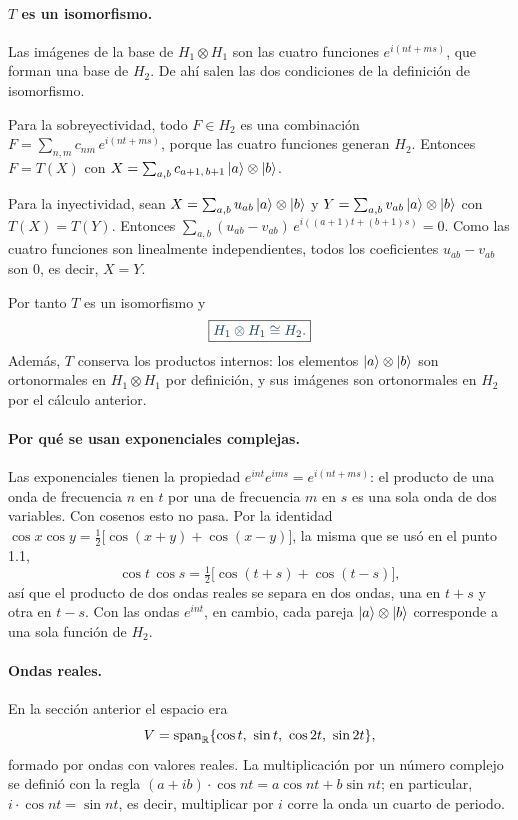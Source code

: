 \paragraph{$T$ es un isomorfismo.} Las imágenes de la base de $H_1\otimes H_1$ son las cuatro funciones $e^{i(nt+ms)}$, que forman una base de $H_2$. De ahí salen las dos condiciones de la definición de isomorfismo.

Para la sobreyectividad, todo $F\in H_2$ es una combinación $F=\sum_{n,m}c_{nm}\,e^{i(nt+ms)}$, porque las cuatro funciones generan $H_2$. Entonces $F=T(X)$ con $X=\sum_{a,b}c_{a+1,\,b+1}\,\lvert a\rangle\otimes\lvert b\rangle$.

Para la inyectividad, sean $X=\sum_{a,b}u_{ab}\,\lvert a\rangle\otimes\lvert b\rangle$ y $Y=\sum_{a,b}v_{ab}\,\lvert a\rangle\otimes\lvert b\rangle$ con $T(X)=T(Y)$. Entonces $\sum_{a,b}(u_{ab}-v_{ab})\,e^{i((a+1)t+(b+1)s)}=0$. Como las cuatro funciones son linealmente independientes, todos los coeficientes $u_{ab}-v_{ab}$ son $0$, es decir, $X=Y$.

Por tanto $T$ es un isomorfismo y
\[
  \destacado{H_1\otimes H_1\cong H_2 .}
\]
Además, $T$ conserva los productos internos: los elementos $\lvert a\rangle\otimes\lvert b\rangle$ son ortonormales en $H_1\otimes H_1$ por definición, y sus imágenes son ortonormales en $H_2$ por el cálculo anterior.

\paragraph{Por qué se usan exponenciales complejas.} Las exponenciales tienen la propiedad $e^{int}e^{ims}=e^{i(nt+ms)}$: el producto de una onda de frecuencia $n$ en $t$ por una de frecuencia $m$ en $s$ es una sola onda de dos variables. Con cosenos esto no pasa. Por la identidad $\cos x\cos y=\frac12\bigl[\cos(x+y)+\cos(x-y)\bigr]$, la misma que se usó en el punto 1.1,
\[
  \cos t\,\cos s=\tfrac12\bigl[\cos(t+s)+\cos(t-s)\bigr],
\]
así que el producto de dos ondas reales se separa en dos ondas, una en $t+s$ y otra en $t-s$. Con las ondas $e^{int}$, en cambio, cada pareja $\lvert a\rangle\otimes\lvert b\rangle$ corresponde a una sola función de $H_2$.

\paragraph{Ondas reales.} En la sección anterior el espacio era
\[
  V=\operatorname{span}_{\mathbb R}\{\cos t,\ \sin t,\ \cos 2t,\ \sin 2t\},
\]
formado por ondas con valores reales. La multiplicación por un número complejo se definió con la regla $(a+ib)\cdot\cos nt=a\cos nt+b\sin nt$; en particular, $i\cdot\cos nt=\sin nt$, es decir, multiplicar por $i$ corre la onda un cuarto de periodo.

